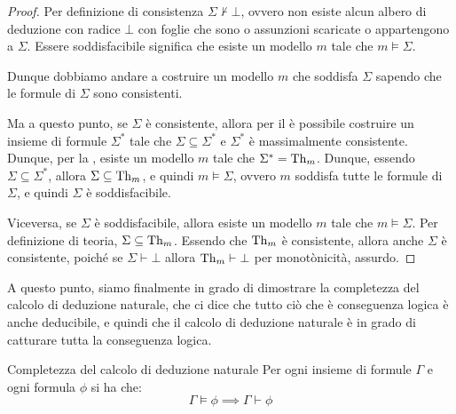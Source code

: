 \begin{proof}
  Per definizione di consistenza \(\Sigma \not\vdash \bot\), ovvero non esiste alcun albero di deduzione con radice \(\bot\) con foglie che sono o assunzioni scaricate o appartengono a \(\Sigma\).
  Essere soddisfacibile significa che esiste un modello \(m\) tale che \(m\models\Sigma\).

  Dunque dobbiamo andare a costruire un modello \(m\) che soddisfa \(\Sigma\) sapendo che le formule di \(\Sigma\) sono consistenti.

  Ma a questo punto, se \(\Sigma\) è consistente, allora per il  è possibile costruire un insieme di formule \(\Sigma^*\) tale che \(\Sigma\subseteq\Sigma^*\) e \(\Sigma^*\) è massimalmente consistente.
  Dunque, per la , esiste un modello \(m\) tale che \(\Sigma^* = \operatorname{Th}_{m}\). Dunque, essendo \(\Sigma\subseteq\Sigma^*\), allora \(\Sigma\subseteq\operatorname{Th}_{m}\), e quindi \(m\models\Sigma\), ovvero \(m\) soddisfa tutte le formule di \(\Sigma\), e quindi \(\Sigma\) è soddisfacibile.

  Viceversa, se \(\Sigma\) è soddisfacibile, allora esiste un modello \(m\) tale che \(m\models\Sigma\). Per definizione di teoria, \(\Sigma\subseteq\operatorname{Th}_{m}\).
  Essendo che \(\operatorname{Th}_{m}\) è consistente, allora anche \(\Sigma\) è consistente, poiché se \(\Sigma\vdash\bot\) allora \(\operatorname{Th}_{m}\vdash\bot\) per monotònicità, assurdo.
\end{proof}

A questo punto, siamo finalmente in grado di dimostrare la completezza del calcolo di deduzione naturale, che ci dice che tutto ciò che è conseguenza logica è anche deducibile, e quindi che il calcolo di deduzione naturale è in grado di catturare tutta la conseguenza logica.

\begin{theorem}{Completezza del calcolo di deduzione naturale}
  Per ogni insieme di formule \(\Gamma\) e ogni formula \(\phi\) si ha che:
  \[\Gamma \models \phi \implies \Gamma \vdash \phi\]
\end{theorem}

